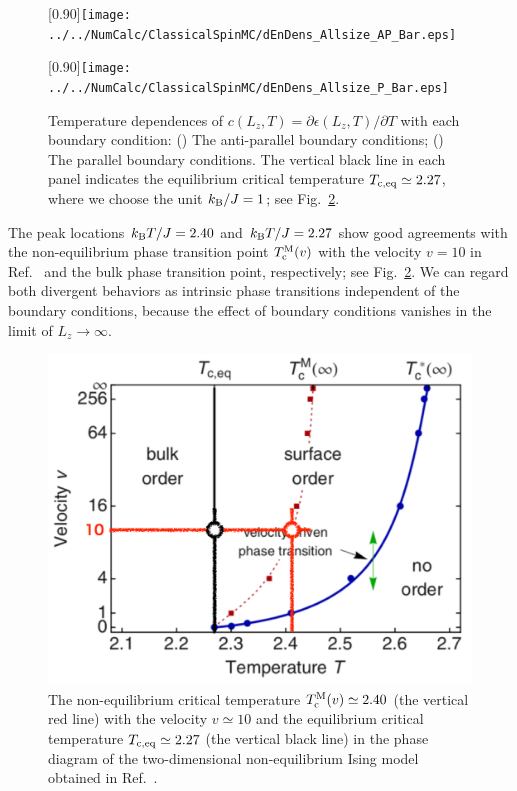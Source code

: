 \begin{figure}[htbp]
	\centering
	\subcaptionbox{\label{fig:dEnDens_Allsize_AP}}[0.90\linewidth]{\texttt{[image: ../../NumCalc/ClassicalSpinMC/dEnDens\_Allsize\_AP\_Bar.eps]}}
	
	\subcaptionbox{\label{fig:dEnDens_Allsize_P}}[0.90\linewidth]{\texttt{[image: ../../NumCalc/ClassicalSpinMC/dEnDens\_Allsize\_P\_Bar.eps]}}
	
	\caption{Temperature dependences of $c(L_{z}, T) = \partial \epsilon(L_{z}, T)/\partial T$ with each boundary condition: () The anti-parallel boundary conditions;  () The parallel boundary conditions. The vertical black line in each panel indicates the equilibrium critical temperature $T_{\rm c,eq}\simeq 2.27$, where we choose the unit $k_{\rm B}/J=1$; see Fig.~\ref{fig:NEPTinIsing_}.}
	\label{fig:dEnDens_Allsize}
\end{figure}

The peak locations $k_{\rm B}T/J=2.40$ and $k_{\rm B}T/J=2.27$ show good agreements with the non-equilibrium phase transition point $T_{\rm c}^{\rm M}(v)$ with the velocity $v=10$ in Ref.~\cite{Hucht2009b} and the bulk phase transition point, respectively; see Fig.~\ref{fig:NEPTinIsing_}. We can regard both divergent behaviors as intrinsic phase transitions independent of the boundary conditions, because the effect of boundary conditions vanishes in the limit of $L_{z}\to\infty$.

\begin{figure}[htbp]
	\centering
	\includegraphics[width=0.5\linewidth]{NEPTIsing_.pdf}
	\caption{The non-equilibrium critical temperature $T^{\rm M}_{\rm c}(v)\simeq 2.40$ (the vertical red line) with the velocity $v\simeq 10$ and the equilibrium critical temperature $T_{\rm c, eq}\simeq 2.27$ (the vertical black line) in the phase diagram of the two-dimensional non-equilibrium Ising model obtained in Ref.~\cite{Hucht2009b}\protect\footnotemark.}
	\label{fig:NEPTinIsing_}
\end{figure}

